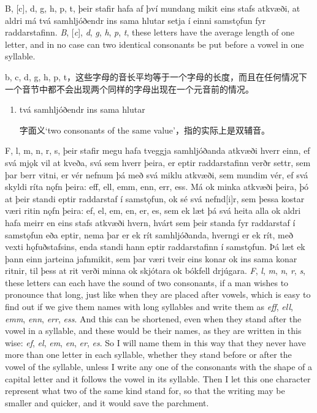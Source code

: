 \begin{paracol}{2}
  B, [c], d, g, h, p, t, þeir stafir hafa af því mundang mikit eins stafs atkvæði, at aldri má tvá samhljóðendr ins sama hlutar setja í einni samstǫfun fyr raddarstafinn.
  \switchcolumn
  \textit{B}, [\textit{c}], \textit{d}, \textit{g}, \textit{h}, \textit{p}, \textit{t}, these letters have the average length of one letter, and in no case can two identical consonants be put before a vowel in one syllable.
\end{paracol}
\begin{translation*}{}
  b, c, d, g, h, p, t，这些字母的音长平均等于一个字母的长度，而且在任何情况下一个音节中都不会出现两个同样的字母出现在一个元音前的情况。
\end{translation*}
\begin{grammar*}{}
  \begin{enumerate}[leftmargin=*]
    \item tvá samhljóðendr ins sama hlutar

          字面义`two consonants of the same value'，指的实际上是双辅音。
  \end{enumerate}
\end{grammar*}
\begin{paracol}{2}
  F, l, m, n, r, s, þeir stafir megu hafa tveggja samhljóðanda atkvæði hverr einn, ef svá mjǫk vil at kveða, svá sem hverr þeira, er eptir raddarstafinn verðr settr, sem þar berr vitni, er vér nefnum þá með svá miklu atkvæði, sem mundim vér, ef svá skyldi ríta nǫfn þeira: eff, ell, emm, enn, err, ess. Má ok minka atkvæði þeira, þó at þeir standi eptir raddarstaf í samstǫfun, ok sé svá nefnd[i]r, sem þessa kostar væri ritin nǫfn þeira: ef, el, em, en, er, es, sem ek læt þá svá heita alla ok aldri hafa meirr en eins stafs atkvæði hvern, hvárt sem þeir standa fyr raddarstaf í samstǫfun eða eptir, nema þar er ek rít samhljóðanda, hverngi er ek rít, með vexti hǫfuðstafsins, enda standi hann eptir raddarstafinn í samstǫfun. Þá læt ek þann einn jarteina jafnmikit, sem þar væri tveir eins konar ok ins sama konar ritnir, til þess at rit verði minna ok skjótara ok bókfell drjúgara.
  \switchcolumn
  \textit{F}, \textit{l}, \textit{m}, \textit{n}, \textit{r}, \textit{s}, these letters can each have the sound of two consonants, if a man wishes to pronounce that long, just like when they are placed after vowels, which is easy to find out if we give them names with long syllables and write them as \textit{eff}, \textit{ell}, \textit{emm}, \textit{enn}, \textit{err}, \textit{ess}. And this can be shortened, even when they stand after the vowel in a syllable, and these would be their names, as they are written in this wise: \textit{ef}, \textit{el}, \textit{em}, \textit{en}, \textit{er}, \textit{es}. So I will name them in this way that they never have more than one letter in each syllable, whether they stand before or after the vowel of the syllable, unless I write any one of the consonants with the shape of a capital letter and it follows the vowel in its syllable. Then I let this one character represent what two of the same kind stand for, so that the writing may be smaller and quicker, and it would save the parchment.
\end{paracol}

